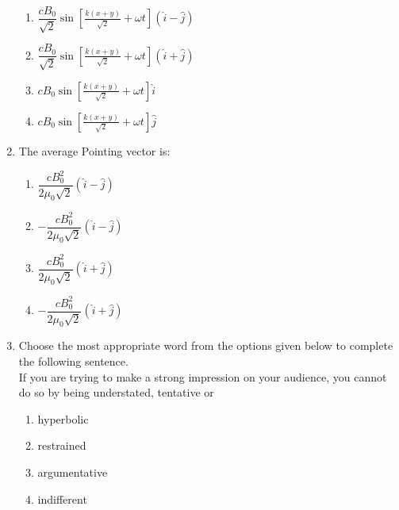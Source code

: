 \documentclass[journal,12pt,onecolumn]{IEEEtran}
\begin{document}
\begin{enumerate}
\hfill{}

\begin{multicols}{2}
\begin{enumerate}
\item $\dfrac{cB_{0}}{\sqrt{2}} \sin\left[\frac{k(x+y)}{\sqrt{2}} + \omega t\right](\hat{i} - \hat{j})$
\item $\dfrac{cB_{0}}{\sqrt{2}} \sin\left[\frac{k(x+y)}{\sqrt{2}} + \omega t\right](\hat{i} + \hat{j})$
\item $cB_{0} \sin\left[\frac{k(x+y)}{\sqrt{2}} + \omega t\right] \hat{i}$
\item $cB_{0} \sin\left[\frac{k(x+y)}{\sqrt{2}} + \omega t\right] \hat{j}$
\end{enumerate}
\end{multicols}

\item The average Pointing vector is:

\hfill{}

\begin{multicols}{2}
\begin{enumerate}
\item $\dfrac{cB_{0}^{2}}{2\mu_{0}\sqrt{2}} (\hat{i} - \hat{j})$
\item $-\dfrac{cB_{0}^{2}}{2\mu_{0}\sqrt{2}} (\hat{i} - \hat{j})$
\item $\dfrac{cB_{0}^{2}}{2\mu_{0}\sqrt{2}} (\hat{i} + \hat{j})$
\item $-\dfrac{cB_{0}^{2}}{2\mu_{0}\sqrt{2}} (\hat{i} + \hat{j})$
\end{enumerate}
\end{multicols}

\newpage

\item Choose the most appropriate word from the options given below to complete the following sentence.\\
If you are trying to make a strong impression on your audience, you cannot do so by being understated, tentative or

\hfill{}

\begin{multicols}{2}
\begin{enumerate}
    \item hyperbolic
    \item restrained
    \item argumentative
    \item indifferent
\end{enumerate}
\end{multicols}


\end{enumerate}
\end{document}
